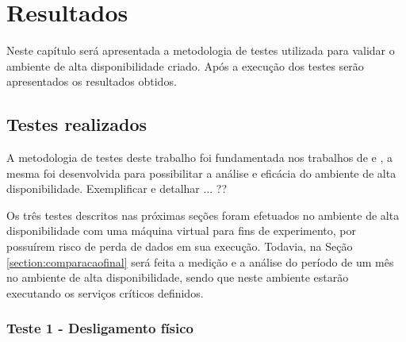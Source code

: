 \chapter{Resultados}
\label{cap:implementacaoresultados}

Neste capítulo será apresentada a metodologia de testes utilizada para validar o ambiente de alta disponibilidade criado. Após a execução
dos testes serão apresentados os resultados obtidos.


\section{Testes realizados}
\label{section:testes}

A metodologia de testes deste trabalho foi fundamentada nos trabalhos de \citet{reis2009} e \citet{goncalves2009}, a mesma foi desenvolvida para 
possibilitar a análise e eficácia do ambiente de alta disponibilidade. Exemplificar e detalhar ... ??

Os três testes descritos nas próximas seções foram efetuados no ambiente de alta disponibilidade com uma máquina virtual para fins de experimento, 
por possuírem risco de perda de dados em sua execução.
Todavia, na Seção \ref{section:comparacaofinal} será feita a medição e a análise do período de um mês no ambiente de alta disponibilidade,
sendo que neste ambiente estarão executando os serviços críticos definidos.

\subsection{Teste 1 - Desligamento físico}

